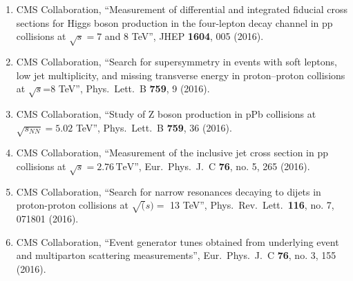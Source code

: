\begin{itemize}
\begin{enumerate}
\item CMS Collaboration, ``Measurement of differential and integrated fiducial cross sections for Higgs boson production in the four-lepton decay channel in pp collisions at $ \sqrt{s}=7 $ and 8 TeV'', JHEP {\bf 1604}, 005 (2016).

\item CMS Collaboration, ``Search for supersymmetry in events with soft leptons, low jet multiplicity, and missing transverse energy in proton–proton collisions at $\sqrt{s}$=8 TeV'', Phys.\ Lett.\ B {\bf 759}, 9 (2016).

\item CMS Collaboration, ``Study of Z boson production in pPb collisions at $\sqrt {s_{NN}} = 5.02$ TeV'', Phys.\ Lett.\ B {\bf 759}, 36 (2016).

\item CMS Collaboration, ``Measurement of the inclusive jet cross section in pp collisions at $\sqrt{s} = 2.76\,\text {TeV}$'', Eur.\ Phys.\ J.\ C {\bf 76}, no. 5, 265 (2016).

\item CMS Collaboration, ``Search for narrow resonances decaying to dijets in proton-proton collisions at $\sqrt(s) =$ 13 TeV'', Phys.\ Rev.\ Lett.\  {\bf 116}, no. 7, 071801 (2016).

\item CMS Collaboration, ``Event generator tunes obtained from underlying event and multiparton scattering measurements'', Eur.\ Phys.\ J.\ C {\bf 76}, no. 3, 155 (2016).


\end{enumerate}
\end{itemize}
